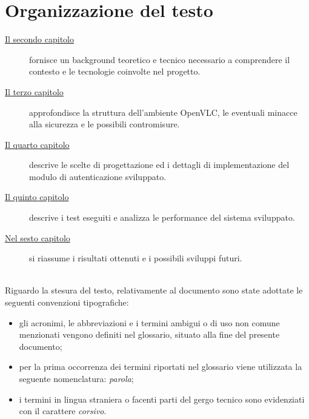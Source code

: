 \section{Organizzazione del testo}

\begin{description}
    \item[{\hyperref[cap:background]{Il secondo capitolo}}] fornisce un background teoretico e tecnico necessario a comprendere il contesto e le tecnologie coinvolte nel progetto. 
    
    \item[{\hyperref[cap:analisi]{Il terzo capitolo}}] approfondisce la struttura dell'ambiente OpenVLC, le eventuali minacce alla sicurezza e le possibili contromisure.
    
    \item[{\hyperref[cap:progettazione]{Il quarto capitolo}}] descrive le scelte di progettazione ed i dettagli di implementazione del modulo di autenticazione sviluppato.
    
    \item[{\hyperref[cap:test]{Il quinto capitolo}}] descrive i test eseguiti e analizza le performance del sistema sviluppato.
        
    \item[{\hyperref[cap:conclusioni]{Nel sesto capitolo}}] si riassume i risultati ottenuti e i possibili sviluppi futuri.
\end{description}

\noindent \\Riguardo la stesura del testo, relativamente al documento sono state adottate le seguenti convenzioni tipografiche:
\begin{itemize}
	\item gli acronimi, le abbreviazioni e i termini ambigui o di uso non comune menzionati vengono definiti nel glossario, situato alla fine del presente documento;
	\item per la prima occorrenza dei termini riportati nel glossario viene utilizzata la seguente nomenclatura: \emph{parola}\glsfirstoccur;
	\item i termini in lingua straniera o facenti parti del gergo tecnico sono evidenziati con il carattere \emph{corsivo}.
\end{itemize}
